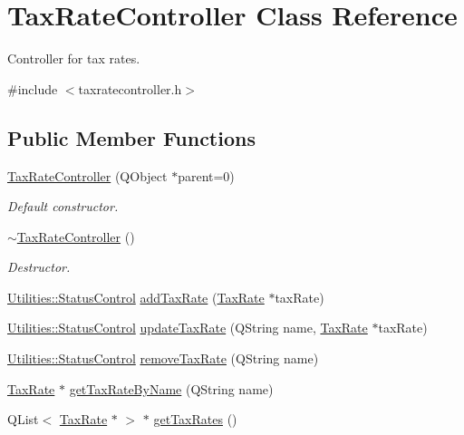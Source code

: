 \hypertarget{class_tax_rate_controller}{\section{\-Tax\-Rate\-Controller \-Class \-Reference}
\label{class_tax_rate_controller}
}


\-Controller for tax rates.  




{\ttfamily \#include $<$taxratecontroller.\-h$>$}

\subsection*{\-Public \-Member \-Functions}
\begin{DoxyCompactItemize}
\item 
\hyperlink{class_tax_rate_controller_a4efde11912bd5ab9cf055095b621c76d}{\-Tax\-Rate\-Controller} (\-Q\-Object $\ast$parent=0)
\begin{DoxyCompactList}\small\item\em \-Default constructor. \end{DoxyCompactList}\item 
\hyperlink{class_tax_rate_controller_a0ee8749ef1749252738a000a65136bf4}{$\sim$\-Tax\-Rate\-Controller} ()
\begin{DoxyCompactList}\small\item\em \-Destructor. \end{DoxyCompactList}\item 
\hyperlink{class_utilities_a2974f062d85bdb0c444a1cbe554bf228}{\-Utilities\-::\-Status\-Control} \hyperlink{class_tax_rate_controller_a4723ae83382d316b174bf8f71a9bbcc4}{add\-Tax\-Rate} (\hyperlink{class_tax_rate}{\-Tax\-Rate} $\ast$tax\-Rate)
\item 
\hyperlink{class_utilities_a2974f062d85bdb0c444a1cbe554bf228}{\-Utilities\-::\-Status\-Control} \hyperlink{class_tax_rate_controller_a9f2f0d6c175127fa95f844d5a2cd1486}{update\-Tax\-Rate} (\-Q\-String name, \hyperlink{class_tax_rate}{\-Tax\-Rate} $\ast$tax\-Rate)
\item 
\hyperlink{class_utilities_a2974f062d85bdb0c444a1cbe554bf228}{\-Utilities\-::\-Status\-Control} \hyperlink{class_tax_rate_controller_a500860ca7c99869553bdc33be02f3395}{remove\-Tax\-Rate} (\-Q\-String name)
\item 
\hyperlink{class_tax_rate}{\-Tax\-Rate} $\ast$ \hyperlink{class_tax_rate_controller_ab711ebdbb49c88e6db9a485b3d8d96ca}{get\-Tax\-Rate\-By\-Name} (\-Q\-String name)
\item 
\-Q\-List$<$ \hyperlink{class_tax_rate}{\-Tax\-Rate} $\ast$ $>$ $\ast$ \hyperlink{class_tax_rate_controller_a8aa8c505aba7542189dabd3d3ef44b23}{get\-Tax\-Rates} ()
\end{DoxyCompactItemize}


